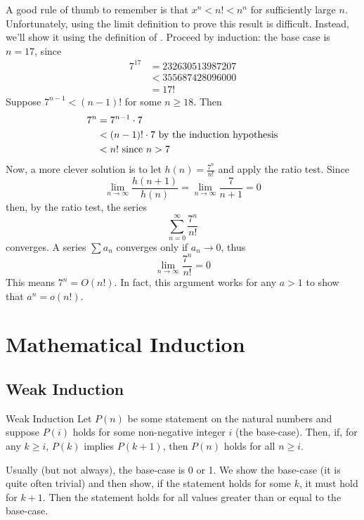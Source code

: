 \begin{solution}
    A good rule of thumb to remember is that $x^n<n!<n^n$ for sufficiently large $n$. Unfortunately, using the limit definition to prove this result is difficult. Instead, we'll show it using the definition of \bigOName. Proceed by induction: the base case is $n = 17$, since
    \begin{align*}7^{17}
         & = 232630513987207 \\
         & < 355687428096000 \\
         & = 17!
    \end{align*}
    Suppose $7^{n - 1} < (n - 1)!$ for some $n\geq 18$. Then
    \begin{align*}7^n
         & = 7^{n-1}\cdot 7                                   \\
         & < (n-1)!\cdot 7\hbox{ by the induction hypothesis} \\
         & < n!\hbox{ since $n > 7$}
    \end{align*}
    Now, a more clever solution is to let $h(n)=\frac{7^n}{n!}$ and apply the ratio test. Since \[\lim_{n\to\infty}\frac{h(n+1)}{h(n)}=\lim_{n\to\infty}\frac{7}{n+1}=0\] then, by the ratio test, the series \[\sum_{n=0}^{\infty}\frac{7^n}{n!}\] converges. A series $\sum a_n$ converges only if $a_n\to0$, thus \[\lim_{n\to\infty}\frac{7^n}{n!}=0\] This means $7^n=O(n!)$. In fact, this argument works for any $a>1$ to show that $a^n=o(n!)$.
\end{solution}

\section{Mathematical Induction}
\subsection{Weak Induction}
\begin{definition}{Weak Induction}{}
    Let $P(n)$ be some statement on the natural numbers and suppose $P(i)$ holds for some non-negative integer $i$ (the base-case). Then, if, for any $k\geq i$, $P(k)$ implies $P(k+1)$, then $P(n)$ holds for all $n\geq i$.
\end{definition}

Usually (but not always), the base-case is 0 or 1. We show the base-case (it is quite often trivial) and then show, if the statement holds for some $k$, it must hold for $k+1$. Then the statement holds for all values greater than or equal to the base-case.
